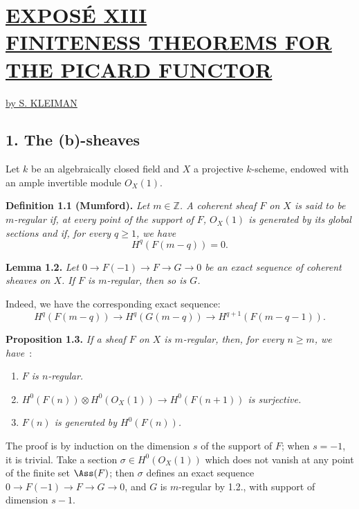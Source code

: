 %
\section*{\underline{EXPOS\'E XIII}\\[3pt] \underline{\underline{FINITENESS THEOREMS FOR THE PICARD FUNCTOR}}}
\begin{center}
\underline{by S. KLEIMAN}
\end{center}

\subsection*{1. The (b)-sheaves}
Let $k$ be an algebraically closed field and $X$ a projective $k$-scheme, endowed with an ample invertible module ${O}_X(1)$.

\textbf{Definition 1.1 (Mumford).} \emph{Let $m\in\mathbb Z$. A coherent sheaf $F$ on $X$ is said to be \emph{$m$-regular} if, at every point of the support of $F$, ${O}_X(1)$ is generated by its global sections and if, for every $q\ge1$, we have}
\[
 H^q(F(m-q))=0.
\]

\textbf{Lemma 1.2.} \emph{Let \(0\longrightarrow F(-1)\longrightarrow F\longrightarrow G\longrightarrow 0\) be an exact sequence of coherent sheaves on $X$}\emph{. If $F$ is $m$-regular, then so is $G$.}

Indeed, we have the corresponding exact sequence:
\[
H^q(F(m-q))\longrightarrow H^q(G(m-q))\longrightarrow H^{q+1}(F(m-q-1)).
\]

\textbf{Proposition 1.3.} \emph{If a sheaf $F$ on $X$ is $m$-regular, then, for every $n\ge m$, we have}~:
\begin{enumerate}[label=(\roman*)]
\item \emph{$F$ is $n$-regular.}
\item \emph{\(H^0(F(n))\otimes H^0({O}_X(1))\longrightarrow H^0(F(n+1))\) is surjective.}
\item \emph{$F(n)$ is generated by \(H^0(F(n))\).}
\end{enumerate}

%
The proof is by induction on the dimension \(s\) of the support of \(F\); when \(s=-1\), it is trivial. Take a section \(\sigma\in H^0({O}_X(1))\) which does not vanish at any point of the finite set \(\Ass(F)\); then \(\sigma\) defines an exact sequence \(0\longrightarrow F(-1)\longrightarrow F\longrightarrow G\longrightarrow 0\), and \(G\) is \(m\)-regular by 1.2., with support of dimension \(s-1\).

